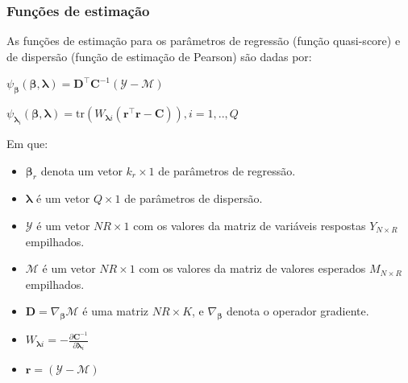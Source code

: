 \documentclass[10pt,
  aspectratio=169,
  serif,
  mathserif,
  professionalfont,
  compress,
  handout,
  ]{beamer}\usepackage[]{graphicx}\usepackage[]{color}
\begin{document}

\begin{frame}

\frametitle{Funções de estimação}

As funções de estimação para os parâmetros de regressão (função quasi-score) e de dispersão (função de estimação de Pearson) são dadas por:

\begin{center}
$\psi_{\boldsymbol{\beta}}(\boldsymbol{\beta}, \boldsymbol{\lambda}) = \boldsymbol{D}^\top \boldsymbol{C}^{-1}(\mathcal{Y} - \mathcal{M})$

$\psi_{\boldsymbol{\lambda}_i}(\boldsymbol{\beta}, \boldsymbol{\lambda}) = \mathrm{tr}(W_{\boldsymbol{\lambda}i} (\boldsymbol{r}^\top\boldsymbol{r} - \boldsymbol{C})),  i = 1,.., Q$
\end{center}

Em que:

\begin{itemize}
  
  \item \normalsize $\boldsymbol{\beta}_r$ denota um vetor $k_r \times 1$ de parâmetros de regressão.
  
  \item \normalsize $\boldsymbol{\lambda}$ é um vetor $Q \times 1$ de parâmetros de dispersão.
  
  \item \normalsize $\mathcal{Y}$ é um vetor $NR \times 1$ com os valores da matriz de variáveis respostas $Y_{N \times R}$ empilhados.
  
  \item \normalsize $\mathcal{M}$ é um vetor $NR \times 1$ com os valores da matriz de valores esperados $M_{N \times R}$ empilhados.
  
  \item \normalsize $\boldsymbol{D} = \nabla_{\boldsymbol{\beta}} \mathcal{M}$ 
é uma matriz $NR \times K$, e $\nabla_{\boldsymbol{\beta}}$ denota o 
operador gradiente.
  
  \item \normalsize $W_{\boldsymbol{\lambda}i} = -\frac{\partial
    \boldsymbol{C}^{-1}}{\partial \boldsymbol{\lambda}_i}$ 
    
  \item \normalsize $\boldsymbol{r} = (\mathcal{Y} - \mathcal{M})$
  
\end{itemize}

\end{frame}
\end{document}
